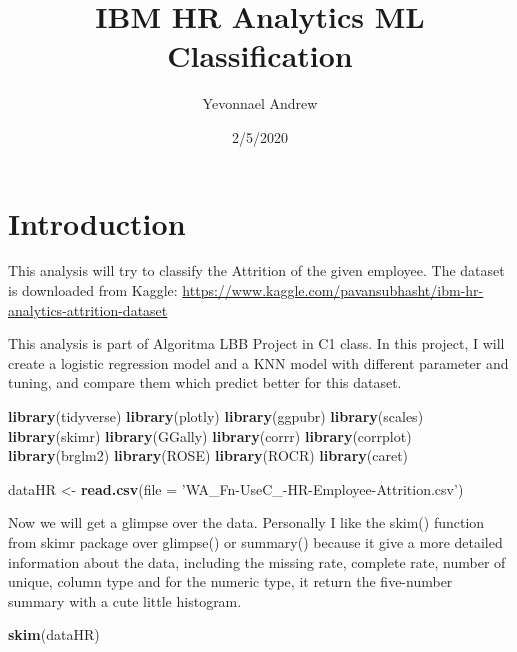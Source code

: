 \documentclass[
]{article}
\title{IBM HR Analytics ML Classification}
\author{Yevonnael Andrew}
\date{2/5/2020}
\newenvironment{Shaded}{\begin{snugshade}}{\end{snugshade}}
\newcommand{\DataTypeTok}[1]{\textcolor[rgb]{0.13,0.29,0.53}{#1}}
\newcommand{\KeywordTok}[1]{\textcolor[rgb]{0.13,0.29,0.53}{\textbf{#1}}}
\newcommand{\NormalTok}[1]{#1}
\newcommand{\StringTok}[1]{\textcolor[rgb]{0.31,0.60,0.02}{#1}}
\begin{document}
\maketitle

\hypertarget{introduction}{%
\section{Introduction}\label{introduction}}

This analysis will try to classify the Attrition of the given employee.
The dataset is downloaded from Kaggle:
\url{https://www.kaggle.com/pavansubhasht/ibm-hr-analytics-attrition-dataset}

This analysis is part of Algoritma LBB Project in C1 class. In this
project, I will create a logistic regression model and a KNN model with
different parameter and tuning, and compare them which predict better
for this dataset.

\begin{Shaded}
\begin{Highlighting}[]
\KeywordTok{library}\NormalTok{(tidyverse)}
\KeywordTok{library}\NormalTok{(plotly)}
\KeywordTok{library}\NormalTok{(ggpubr)}
\KeywordTok{library}\NormalTok{(scales)}
\KeywordTok{library}\NormalTok{(skimr)}
\KeywordTok{library}\NormalTok{(GGally)}
\KeywordTok{library}\NormalTok{(corrr)}
\KeywordTok{library}\NormalTok{(corrplot)}
\KeywordTok{library}\NormalTok{(brglm2)}
\KeywordTok{library}\NormalTok{(ROSE)}
\KeywordTok{library}\NormalTok{(ROCR)}
\KeywordTok{library}\NormalTok{(caret)}
\end{Highlighting}
\end{Shaded}

\begin{Shaded}
\begin{Highlighting}[]
\NormalTok{dataHR <-}\StringTok{ }\KeywordTok{read.csv}\NormalTok{(}\DataTypeTok{file =} \StringTok{'WA_Fn-UseC_-HR-Employee-Attrition.csv'}\NormalTok{)}
\end{Highlighting}
\end{Shaded}

Now we will get a glimpse over the data. Personally I like the skim()
function from skimr package over glimpse() or summary() because it give
a more detailed information about the data, including the missing rate,
complete rate, number of unique, column type and for the numeric type,
it return the five-number summary with a cute little histogram.

\begin{Shaded}
\begin{Highlighting}[]
\KeywordTok{skim}\NormalTok{(dataHR)}
\end{Highlighting}
\end{Shaded}
\end{document}
